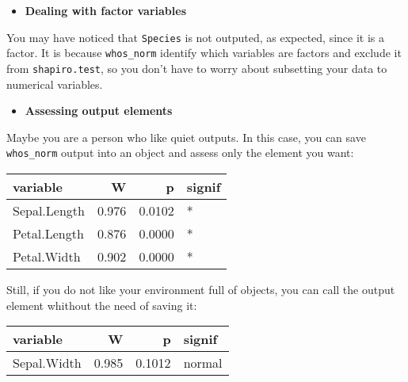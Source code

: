 \documentclass[]{article}
\newenvironment{Shaded}{}{}
\newcommand{\CommentTok}[1]{\textcolor[rgb]{0.38,0.63,0.69}{\textit{#1}}}
\newcommand{\KeywordTok}[1]{\textcolor[rgb]{0.00,0.44,0.13}{\textbf{#1}}}
\newcommand{\NormalTok}[1]{#1}
\newcommand{\OperatorTok}[1]{\textcolor[rgb]{0.40,0.40,0.40}{#1}}
\newcommand{\StringTok}[1]{\textcolor[rgb]{0.25,0.44,0.63}{#1}}
\providecommand{\tightlist}{%
  \setlength{\itemsep}{0pt}\setlength{\parskip}{0pt}}
\begin{document}
\begin{itemize}
\tightlist
\item
  \textbf{Dealing with factor variables}
\end{itemize}

You may have noticed that \texttt{Species} is not outputed, as expected,
since it is a factor. It is because \texttt{whos\_norm} identify which
variables are factors and exclude it from \texttt{shapiro.test}, so you
don't have to worry about subsetting your data to numerical variables.

\begin{itemize}
\tightlist
\item
  \textbf{Assessing output elements}
\end{itemize}

Maybe you are a person who like quiet outputs. In this case, you can
save \texttt{whos\_norm} output into an object and assess only the
element you want:

\begin{Shaded}
\end{Shaded}

\begin{longtable}[]{@{}lrrl@{}}
\toprule
variable & W & p & signif\tabularnewline
\midrule
\endhead
Sepal.Length & 0.976 & 0.0102 & *\tabularnewline
Petal.Length & 0.876 & 0.0000 & *\tabularnewline
Petal.Width & 0.902 & 0.0000 & *\tabularnewline
\bottomrule
\end{longtable}

Still, if you do not like your environment full of objects, you can call
the output element whithout the need of saving it:

\begin{Shaded}
\end{Shaded}

\begin{longtable}[]{@{}lrrl@{}}
\toprule
variable & W & p & signif\tabularnewline
\midrule
\endhead
Sepal.Width & 0.985 & 0.1012 & normal\tabularnewline
\bottomrule
\end{longtable}
\end{document}
